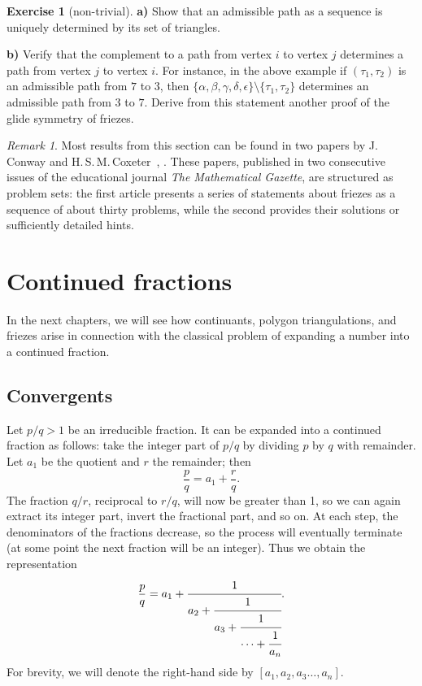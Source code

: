 \documentclass[a4paper,11pt]{amsart}
\theoremstyle{plain}
\theoremstyle{remark}
\newtheorem{remark}[theorem]{Remark}
\theoremstyle{definition}
\newtheorem{exercise}[theorem]{Exercise}
\numberwithin{equation}{section}
\numberwithin{figure}{section}
\begin{document}
\begin{exercise}[non-trivial] \textbf{a)} Show that an admissible path as a sequence is uniquely determined by its set of triangles.

\textbf{b)} Verify that the complement to a path from vertex $i$ to vertex $j$ determines a path from vertex $j$ to vertex $i$. For instance, in the above example if $(\tau_1,\tau_2)$ is an admissible path from $7$ to $3$, then $\{\alpha,\beta,\gamma,\delta,\epsilon\}\setminus 
\{\tau_1,\tau_2\}$ determines an admissible path from $3$ to $7$. Derive from this statement another proof of the glide symmetry of friezes.
\end{exercise}

\begin{remark} Most results from this section can be found in two papers by J.\,Conway and H.\,S.\,M.\,Coxeter~\cite{ConwayCoxeter73a}, \cite{ConwayCoxeter73b}. These papers, published in two consecutive issues of the educational journal \emph{The Mathematical Gazette}, are structured as problem sets: the first article presents a series of statements about friezes as a sequence of about thirty problems, while the second provides their solutions or sufficiently detailed hints.
\end{remark}




\section{Continued fractions}

In the next chapters, we will see how continuants, polygon triangulations, and friezes arise in connection with the classical problem of expanding a number into a continued fraction.

\subsection{Convergents}

Let $p/q > 1$ be an irreducible fraction. It can be expanded into a continued fraction as follows: take the integer part of $p/q$ by dividing $p$ by $q$ with remainder. Let $a_1$ be the quotient and $r$ the remainder; then
\[
\frac{p}{q} = a_1 + \frac{r}{q}.
\]
The fraction $q/r$, reciprocal to $r/q$, will now be greater than 1, so we can again extract its integer part, invert the fractional part, and so on. At each step, the denominators of the fractions decrease, so the process will eventually terminate (at some point the next fraction will be an integer). Thus we obtain the representation
\[
\frac{p}{q} = a_1 + \cfrac{1}{a_2 + \cfrac{1}{a_3 + \cfrac{1}{\dots + \cfrac{1}{a_n}}}}.
\]
For brevity, we will denote the right-hand side by $[a_1, a_2, a_3 \dots, a_n]$.
\end{document}
